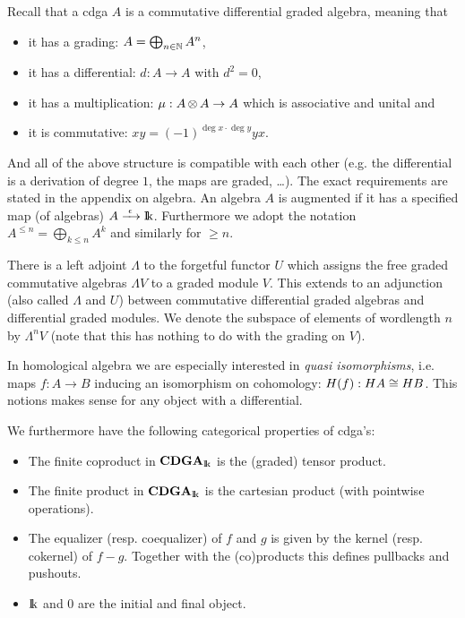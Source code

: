 

Recall that a cdga $A$ is a commutative differential graded algebra, meaning that
\begin{itemize}\itemsep0em
	\item it has a grading: $A = \bigoplus_{n\in\mathbb{N}} A^n$,
	\item it has a differential: $d: A \to A$ with $d^2 = 0$,
	\item it has a multiplication: $\mu: A \operatorname*{\otimes} A \to A$ which is associative and unital and
	\item it is commutative: $x y = (-1)^{\deg{x}\cdot\deg{y}} y x$.
\end{itemize}
And all of the above structure is compatible with each other (e.g. the differential is a derivation of degree $1$, the maps are graded, \dots). The exact requirements are stated in the appendix on algebra. An algebra $A$ is augmented if it has a specified map (of algebras) $A \xrightarrow{\,\,{\epsilon}\,\,} \mathrm{I\!k}$. Furthermore we adopt the notation $A^{\leq n} = \bigoplus_{k \leq n} A^k$ and similarly for $\geq n$.

There is a left adjoint $\Lambda$ to the forgetful functor $U$ which assigns the free graded commutative algebras $\Lambda V$ to a graded module $V$. This extends to an adjunction (also called $\Lambda$ and $U$) between commutative differential graded algebras and differential graded modules. We denote the subspace of elements of wordlength $n$ by $\Lambda^n V$ (note that this has nothing to do with the grading on $V$).

In homological algebra we are especially interested in \emph{quasi isomorphisms}, i.e. maps $f: A \to B$ inducing an isomorphism on cohomology: $H(f): HA \cong HB$. This notions makes sense for any object with a differential.

We furthermore have the following categorical properties of cdga's:
\begin{itemize}\itemsep0em
	\item The finite coproduct in $\mathbf{CDGA}_{\mathrm{I\!k}}$ is the (graded) tensor product.
	\item The finite product in $\mathbf{CDGA}_{\mathrm{I\!k}}$ is the cartesian product (with pointwise operations).
	\item The equalizer (resp. coequalizer) of $f$ and $g$ is given by the kernel (resp. cokernel) of $f - g$. Together with the (co)products this defines pullbacks and pushouts.
	\item $\mathrm{I\!k}$ and $0$ are the initial and final object.
\end{itemize}

